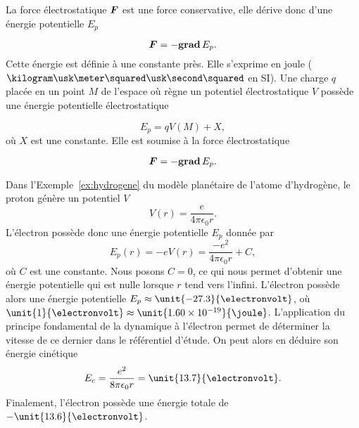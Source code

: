 \begin{defn}
	La force électrostatique $\vecf$ est une force conservative, elle 
	dérive donc d'une énergie potentielle $E_p$

	\begin{equation}
		\vecf = - \gradient E_p.
	\end{equation}
	Cette énergie est définie à une constante
	près. Elle s'exprime en joule ($\kilogram \usk \meter \squared \usk \second
	\squared$ en SI). Une charge $q$ placée en un point $M$ de
	l'espace où règne un potentiel électrostatique $V$ possède une 
	énergie potentielle électrostatique 

	\begin{equation*}
		E_p = q V(M) + X,
	\end{equation*}
	où $X$ est une constante. Elle est soumise à la force électrostatique

	\begin{equation*}
		\vecf = -\gradient E_p.
	\end{equation*}
\end{defn}

\begin{exemple}
	Dans l'Exemple~\ref{ex:hydrogene} du modèle planétaire
	de l'atome d'hydrogène, le proton génère
	un potentiel $V$
	\begin{equation*}
		V(r) = \dfrac{e}{4 \pi \epsilon_0 r}.
	\end{equation*}
	L'électron possède donc une énergie potentielle $E_p$ donnée par
	\begin{equation*}
		E_p(r) = -eV(r) = \dfrac{-e^2}{4 \pi \epsilon_0 r} + C,
	\end{equation*}
	où $C$ est une constante. Nous posons $C = 0$, ce qui nous permet d'obtenir une énergie
	potentielle qui est nulle lorsque $r$ tend vers l'infini. L'électron 
	possède alors une énergie potentielle
	$E_p \approx \unit{-27.3}{\electronvolt}$,
        où $\unit{1}{\electronvolt} \approx \unit{1.60 \times 10^{-19}}{\joule}$.
	L'application du principe fondamental de la dynamique à l'électron permet
	de déterminer la vitesse de ce dernier dans le référentiel d'étude.
	On peut alors en déduire son énergie cinétique
	\begin{equation*}
		E_c = \dfrac{e^2}{8 \pi \epsilon_0 r} = \unit{13.7}{\electronvolt}.
	\end{equation*}
	Finalement, l'électron possède une énergie totale de $-\unit{13.6}{\electronvolt}$.
\end{exemple}

